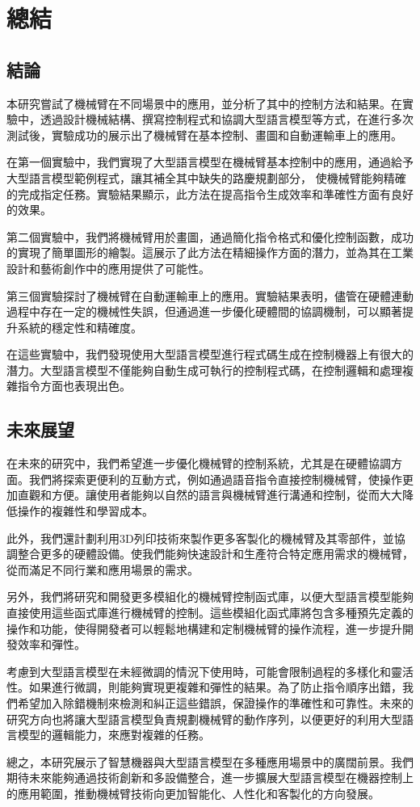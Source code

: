 \documentclass[class=NCU_thesis, crop=false]{standalone}
\begin{document}
\chapter{總結}

\section{結論}

本研究嘗試了機械臂在不同場景中的應用，並分析了其中的控制方法和結果。在實驗中，透過設計機械結構、撰寫控制程式和協調大型語言模型等方式，在進行多次測試後，實驗成功的展示出了機械臂在基本控制、畫圖和自動運輸車上的應用。

在第一個實驗中，我們實現了大型語言模型在機械臂基本控制中的應用，通過給予大型語言模型範例程式，讓其補全其中缺失的路慶規劃部分，
使機械臂能夠精確的完成指定任務。實驗結果顯示，此方法在提高指令生成效率和準確性方面有良好的效果。

第二個實驗中，我們將機械臂用於畫圖，通過簡化指令格式和優化控制函數，成功的實現了簡單圖形的繪製。這展示了此方法在精細操作方面的潛力，並為其在工業設計和藝術創作中的應用提供了可能性。

第三個實驗探討了機械臂在自動運輸車上的應用。實驗結果表明，儘管在硬體連動過程中存在一定的機械性失誤，但通過進一步優化硬體間的協調機制，可以顯著提升系統的穩定性和精確度。

在這些實驗中，我們發現使用大型語言模型進行程式碼生成在控制機器上有很大的潛力。大型語言模型不僅能夠自動生成可執行的控制程式碼，在控制邏輯和處理複雜指令方面也表現出色。
\section{未來展望}

在未來的研究中，我們希望進一步優化機械臂的控制系統，尤其是在硬體協調方面。我們將探索更便利的互動方式，例如通過語音指令直接控制機械臂，使操作更加直觀和方便。讓使用者能夠以自然的語言與機械臂進行溝通和控制，從而大大降低操作的複雜性和學習成本。

此外，我們還計劃利用3D列印技術來製作更多客製化的機械臂及其零部件，並協調整合更多的硬體設備。使我們能夠快速設計和生產符合特定應用需求的機械臂，從而滿足不同行業和應用場景的需求。

另外，我們將研究和開發更多模組化的機械臂控制函式庫，以便大型語言模型能夠直接使用這些函式庫進行機械臂的控制。這些模組化函式庫將包含多種預先定義的操作和功能，使得開發者可以輕鬆地構建和定制機械臂的操作流程，進一步提升開發效率和彈性。

考慮到大型語言模型在未經微調的情況下使用時，可能會限制過程的多樣化和靈活性。如果進行微調，則能夠實現更複雜和彈性的結果。為了防止指令順序出錯，我們希望加入除錯機制來檢測和糾正這些錯誤，保證操作的準確性和可靠性。未來的研究方向也將讓大型語言模型負責規劃機械臂的動作序列，以便更好的利用大型語言模型的邏輯能力，來應對複雜的任務。

總之，本研究展示了智慧機器與大型語言模型在多種應用場景中的廣闊前景。我們期待未來能夠通過技術創新和多設備整合，進一步擴展大型語言模型在機器控制上的應用範圍，推動機械臂技術向更加智能化、人性化和客製化的方向發展。
\end{document}
